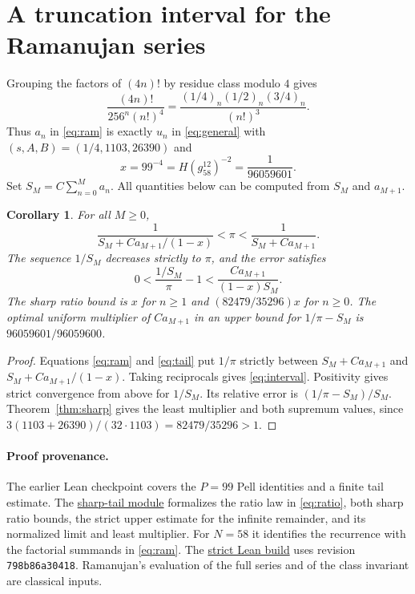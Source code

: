\documentclass[11pt,reqno]{amsart}
\newtheorem{corollary}[theorem]{Corollary}
\newcommand{\poch}[2]{(#1)_{#2}}
\begin{document}
\section{A truncation interval for the Ramanujan series}

Grouping the factors of $(4n)!$ by residue class modulo $4$ gives
\[
 \frac{(4n)!}{256^n(n!)^4}=
 \frac{\poch{1/4}{n}\poch{1/2}{n}\poch{3/4}{n}}{(n!)^3}.
\]
Thus $a_n$ in \eqref{eq:ram} is exactly $u_n$ in \eqref{eq:general}
with $(s,A,B)=(1/4,1103,26390)$ and
\begin{equation}\label{eq:bridge}
 x=99^{-4}=H(g_{58}^{12})^{-2}=\frac1{96059601}.
\end{equation}
Set $S_M=C\sum_{n=0}^{M}a_n$. All quantities below can be computed
from $S_M$ and $a_{M+1}$.

\begin{corollary}
For all $M\geq0$,
\begin{equation}\label{eq:interval}
 \frac{1}{S_M+Ca_{M+1}/(1-x)}
   <\pi<
 \frac{1}{S_M+Ca_{M+1}} .
\end{equation}
The sequence $1/S_M$ decreases strictly to $\pi$, and the error satisfies
\[
 0<\frac{1/S_M}{\pi}-1<\frac{C a_{M+1}}{(1-x)S_M}.
\]
The sharp ratio bound is $x$ for $n\geq1$ and
$(82479/35296)x$ for $n\geq0$.
The optimal uniform multiplier of $C a_{M+1}$ in an upper bound for
$1/\pi-S_M$ is $96059601/96059600$.
\end{corollary}

\begin{proof}
Equations \eqref{eq:ram} and \eqref{eq:tail} put $1/\pi$ strictly between
$S_M+Ca_{M+1}$ and $S_M+Ca_{M+1}/(1-x)$. Taking reciprocals gives
\eqref{eq:interval}. Positivity gives strict convergence from above for
$1/S_M$. Its relative error is $(1/\pi-S_M)/S_M$. Theorem~\ref{thm:sharp}
gives the least multiplier and both supremum values, since
$3(1103+26390)/(32\cdot1103)=82479/35296>1$.
\end{proof}

\paragraph{Proof provenance.}
The earlier Lean checkpoint \cite{Checkpoint} covers the $P=99$ Pell identities
and a finite tail estimate. The \href{https://github.com/awdawmip/enterprise-math/blob/798b86a30418df4ae24bd678e01df3ed0a62b0d9/EnterpriseMath/Precision/SharpPositiveTail.lean}{sharp-tail module}
formalizes the ratio law in \eqref{eq:ratio}, both sharp ratio bounds, the
strict upper estimate for the infinite remainder, and its normalized limit
and least multiplier. For $N=58$ it identifies the recurrence with the
factorial summands in \eqref{eq:ram}. The
\href{https://github.com/awdawmip/enterprise-math/actions/runs/43376958085}{strict Lean build}
uses revision \texttt{798b86a30418}. Ramanujan's evaluation of the full
series and of the class invariant are classical inputs.
\end{document}
